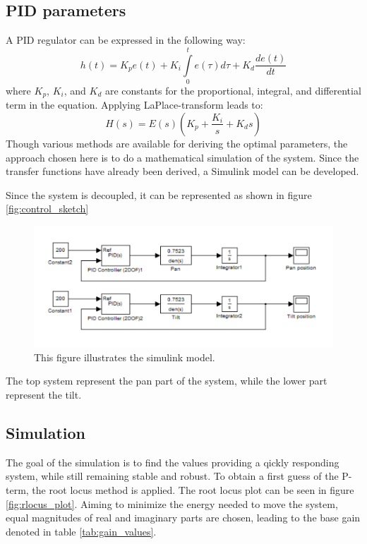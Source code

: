 \subsection{PID parameters}
A PID regulator can be expressed in the following way:
\begin{equation}
	h(t) = K_p e(t) + K_i \int\limits_0^t e(\tau) d\tau + K_d \frac{de(t)}{dt}
\end{equation}
where $K_p$, $K_i$, and $K_d$ are constants for the proportional, integral, and differential term in the equation. Applying LaPlace-transform leads to:
\begin{equation}
	H(s) = E(s)(K_p + \frac{K_i}{s} + K_d s)
\end{equation}
Though various methods are available for deriving the optimal parameters, the
approach chosen here is to do a mathematical simulation of the system. Since the
transfer functions have already been derived, a Simulink model can be developed.

Since the system is decoupled, it can be represented as shown in figure \ref{fig:control_sketch}
\begin{figure}[htb]
	\centering
	\includegraphics[width=\textwidth,trim=0 15 0 15]{graphics/Simulink.pdf} %
	\caption{This figure illustrates the simulink model.}
	\label{fig:control_simulink}			%
\end{figure}
The top system represent the pan part of the system, while the lower part represent the tilt.

\subsection{Simulation}
The goal of the simulation is to find the values providing a qickly responding system, while still remaining stable and robust. To obtain a first guess of the P-term, the root locus method is applied. The root locus plot can be seen in figure \ref{fig:rlocus_plot}. Aiming to minimize the energy needed to move the system, equal magnitudes of real and imaginary parts are chosen, leading to the base gain denoted in table \ref{tab:gain_values}.

